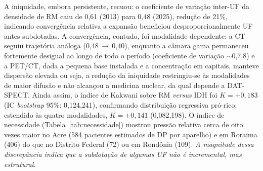 \documentclass[12pt,a4paper,oneside]{article}
\begin{document}
A iniquidade, embora persistente, recuou: o coeficiente de variação
inter-UF da densidade de RM caiu de 0,61 (2013) para 0,48 (2025),
redução de 21\%, indicando convergência relativa \textemdash{} a
expansão beneficiou desproporcionalmente UF antes subdotadas. A
convergência, contudo, foi modalidade-dependente: a CT seguiu
trajetória análoga (0,48\,$\rightarrow$\,0,40), enquanto a câmara gama
permaneceu fortemente desigual ao longo de todo o período
(coeficiente de variação $\sim$0,7,8) e a PET/CT, dada a
pequena base instalada e a concentração em capitais, manteve dispersão
elevada \textemdash{} ou seja, a redução da iniquidade restringiu-se às
modalidades de maior difusão e não alcançou a medicina nuclear, da qual
depende a DAT-SPECT. Ainda assim, o índice de Kakwani sobre RM
\textit{versus} IDH foi
$K = +0{,}183$ (IC \textit{bootstrap} 95\%: 0,124,241),
confirmando distribuição regressiva pró-rico; estendido às quatro
modalidades, $K = +0{,}141$ (0,082,198). O índice de
necessidade (Tabela~\ref{tab:necessidade}) mostrou pressão relativa
cerca de oito vezes maior no Acre (584 pacientes estimados de DP por
aparelho) e em Roraima (406) do que no Distrito Federal (72) ou em
Rondônia (109). \textit{A magnitude dessa discrepância indica que a
subdotação de algumas UF não é incremental, mas estrutural.}
\end{document}
